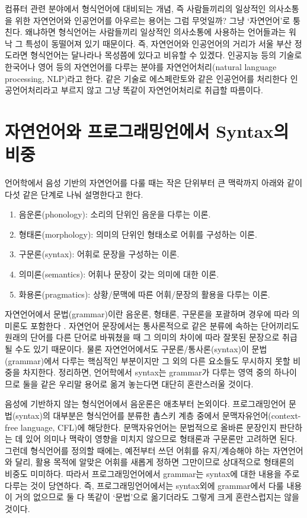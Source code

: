 컴퓨터 관련 분야에서 형식언어에 대비되는 개념, 즉 사람들끼리의 일상적인
의사소통을 위한 자연언어와 인공언어를 아우르는 용어는 그럼 무엇일까?
그냥 `자연언어'로 퉁친다. 왜냐하면 형식언어는 사람들끼리 일상적인
의사소통에 사용하는 언어들과는 워낙 그 특성이 동떨어져 있기 때문이다.
즉, 자연언어와 인공언어의 거리가 서울 부산 정도라면 형식언어는 달나라나
목성쯤에 있다고 비유할 수 있겠다. 인공지능 등의 기술로 한국어나 영어 등의
자연언어를 다루는 분야를 자연언어처리(natural language processing, NLP)라고 한다.
같은 기술로 에스페란토와 같은 인공언어를 처리한다 인공언어처리라고 부르지 않고
그냥 똑같이 자연언어처리로 취급할 따름이다.

\section{자연언어와 프로그래밍언에서 Syntax의 비중}
\label{sec:NatProgSyn}
언어학에서 음성 기반의 자연언어를 다룰 때는
작은 단위부터 큰 맥락까지 아래와 같이 다섯 같은 단계로 나눠 설명한다고 한다.
\begin{enumerate}\tightlist
    \item 음운론(phonology):
    소리의 단위인 음운을 다루는 이론.
    \item 형태론(morphology):
    의미의 단위인 형태소로 어휘를 구성하는 이론.
    \item 구문론(syntax):
    어휘로 문장을 구성하는 이론.
    \item 의미론(semantics):
    어휘나 문장이 갖는 의미에 대한 이론.
    \item 화용론(pragmatics):
    상황/문맥에 따른 어휘/문장의 활용을 다루는 이론.
\end{enumerate}
자연언어에서 문법(grammar)이란 음운론, 형태론, 구문론을 포괄하며 경우에 따라
의미론도 포함한다 \cite{IntroEngSem}. 자연언어 문장에서는 통사론적으로 같은
분류에 속하는 단어끼리도 원래의 단어를 다른 단어로 바꿔쳤을 때 그 의미의
차이에 따라 잘못된 문장으로 취급될 수도 있기 때문이다. 물론 자연언어에서도
구문론/통사론(syntax)이 문법(grammar)에서 다루는 핵심적인 부분이지만
그 외의 다른 요소들도 무시하지 못할 비중을 차지한다. 정리하면,
언어학에서 syntax는 grammar가 다루는 영역 중의 하나이므로
둘을 같은 우리말 용어로 옮겨 놓는다면 대단히 혼란스러울 것이다.

음성에 기반하지 않는 형식언어에서 음운론은 애초부터 논외이다.
프로그래밍언어 문법(syntax)의 대부분은 형식언어를 분류한 촘스키 계층
중에서 문맥자유언어(context-free language, CFL)에 해당한다.
문맥자유언어는 문법적으로 올바른 문장인지 판단하는 데 있어 의미나 맥락이
영향을 미치지 않으므로 형태론과 구문론만 고려하면 된다. 그런데 형식언어를
정의할 때에는, 예전부터 쓰던 어휘를 유지/계승해야 하는 자연언어와 달리, 
활용 목적에 알맞은 어휘를 새롭게 정하면 그만이므로 상대적으로 형태론의
비중도 미미하다. 따라서 프로그래밍언어에서 grammar는 syntax에 대한 내용을
주로 다루는 것이 당연하다. 즉, 프로그래밍언어에서는 syntax외에 grammar에서
다룰 내용이 거의 없으므로 둘 다 똑같이 `문법'으로 옮기더라도 그렇게 크게
혼란스럽지는 않을 것이다.


